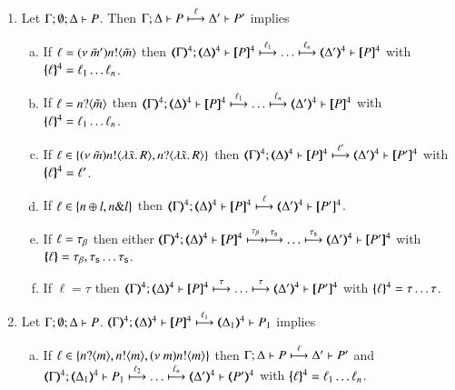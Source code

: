 \begin{proposition}\rm
	\label{prop:op_cor:pHOp_to_HOp}
%
	\begin{enumerate}
		\item	Let $\Gamma; \emptyset; \Delta \vdash P$. Then
			$\Gamma; \Delta \vdash P \stackrel{\ell}{\longmapsto} \Delta' \vdash P'$ implies
%
			\begin{enumerate}[a)]
				\item	If $\ell = (\nu\ \tilde{m}') n ! \langle \tilde{m} \rangle$ then
					$\horel{\tmap{\Gamma}{4}}{\tmap{\Delta}{4}}{\pmap{P}{4}}{\hby{\ell_1} \dots \hby{\ell_n}}{\tmap{\Delta'}{4}}{\pmap{P}{4}}$
					with $\{\!\!\{\ell\}\!\!\}^{4} = \ell_1 \dots \ell_n$.

				\item	If $\ell = n ? \langle \tilde{m} \rangle$ then
					$\horel{\tmap{\Gamma}{4}}{\tmap{\Delta}{4}}{\pmap{P}{4}}{\hby{\ell_1} \dots \hby{\ell_n}}{\tmap{\Delta'}{4}}{\pmap{P}{4}}$
					with $\{\!\!\{\ell\}\!\!\}^{4} = \ell_1 \dots \ell_n$.

				\item	If $\ell \in \{(\nu\ \tilde{m}) n ! \langle \lambda \tilde{x}.\,R \rangle, n ? \langle \lambda \tilde{x}.\,R \rangle\}$ then
					$\horel{\tmap{\Gamma}{4}}{\tmap{\Delta}{4}}{\pmap{P}{4}}{\hby{\ell'}}
					{\tmap{\Delta'}{4}}{\pmap{P'}{4}}$ with $\{\!\!\{\ell\}\!\!\}^{4} = \ell'$.

				\item	If $\ell \in \{n \oplus l, n \& l\}$ then
					$\horel{\tmap{\Gamma}{4}}{\tmap{\Delta}{4}}{\pmap{P}{4}}{\hby{\ell}}
					{\tmap{\Delta'}{4}}{\pmap{P'}{4}}$.

				\item	If $\ell = \tau_{\beta}$ then either
					$\horel{\tmap{\Gamma}{4}}{\tmap{\Delta}{4}}{\pmap{P}{4}}{\hby{\btau} \hby{\stau} \dots \hby{\stau}}
					{\tmap{\Delta'}{4}}{\pmap{P'}{4}}$ with $\{\!\!\{\ell\}\!\!\} = \tau_{\beta}, \tau_{\mathsf{s}} \dots \tau_{\mathsf{s}}$.

				\item	If $\ell = \tau$ then %
					$\horel{\tmap{\Gamma}{4}}{\tmap{\Delta}{4}}{\pmap{P}{4}}{\hby{\tau} \dots \hby{\tau}}
					{\tmap{\Delta'}{4}}{\pmap{P'}{4}}$ with $\{\!\!\{\ell\}\!\!\}^{4} = \tau \dots \tau$.
			\end{enumerate}

		\item	Let $\Gamma; \emptyset; \Delta \vdash P$.
			$\horel{\tmap{\Gamma}{4}}{\tmap{\Delta}{4}}{\pmap{P}{4}}{\hby{\ell_1}}
			{\tmap{\Delta_1}{4}}{P_1}$ implies
%
			\begin{enumerate}[a)]
				\item	If $\ell \in \{n ? \langle m \rangle, n ! \langle m \rangle, (\nu\ m) n ! \langle m \rangle\}$ then
					$\Gamma; \Delta \vdash P \stackrel{\ell}{\longmapsto} \Delta' \vdash P'$ and\\
					$\horel{\tmap{\Gamma}{4}}{\tmap{\Delta_1}{4}}{P_1}{\hby{\ell_2} \dots \hby{\ell_n}}
					{\tmap{\Delta'}{4}}{\tmap{P'}{4}}$ with $\{\!\!\{\ell\}\!\!\}^{4} = \ell_1 \dots \ell_n$.


\end{enumerate}
\end{enumerate}
\end{proposition}
